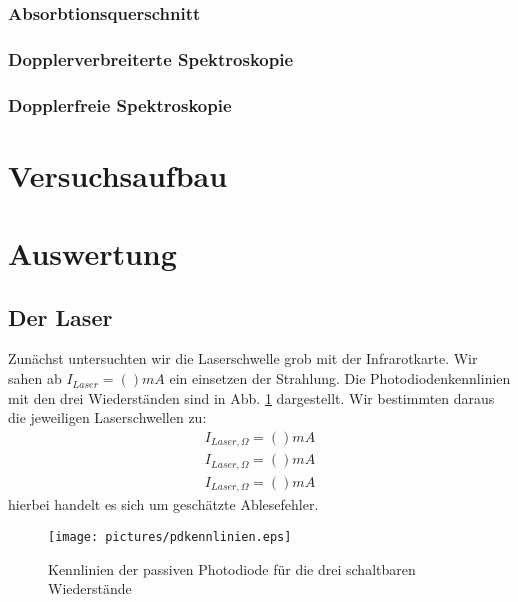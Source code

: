 \documentclass[12pt]{article}
\begin{document}
\subsubsection{Absorbtionsquerschnitt}

\subsubsection{Dopplerverbreiterte Spektroskopie}
\subsubsection{Dopplerfreie Spektroskopie}
\section{Versuchsaufbau}
\section{Auswertung}
\subsection{Der Laser}
Zunächst untersuchten wir die Laserschwelle grob mit der Infrarotkarte. Wir sahen ab $I_{Laser} = () mA$ ein einsetzen der Strahlung.
Die Photodiodenkennlinien mit den drei Wiederständen sind in Abb. \ref{pdkennlinien} dargestellt. Wir bestimmten daraus die jeweiligen Laserschwellen zu:
\begin{align*}
 I_{Laser, \Omega} = () mA \\
 I_{Laser, \Omega} = () mA \\
 I_{Laser, \Omega} = () mA
\end{align*}
hierbei handelt es sich um geschätzte Ablesefehler.
\begin{figure}
 \texttt{[image: pictures/pdkennlinien.eps]}
 \caption{Kennlinien der passiven Photodiode für die drei schaltbaren Wiederstände}
 \label{pdkennlinien}
\end{figure}
\end{document}

